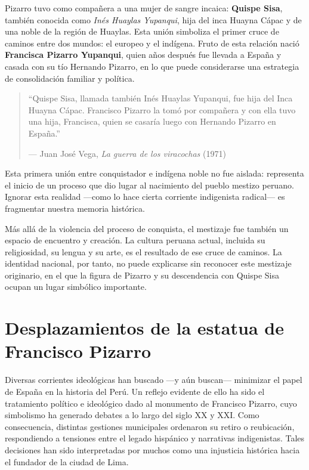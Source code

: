 \documentclass[a4paper,12pt]{article}
\begin{document}
	Pizarro tuvo como compañera a una mujer de sangre incaica: \textbf{Quispe Sisa}, también conocida como \textit{Inés Huaylas Yupanqui}, hija del inca Huayna Cápac y de una noble de la región de Huaylas. Esta unión simboliza el primer cruce de caminos entre dos mundos: el europeo y el indígena. Fruto de esta relación nació \textbf{Francisca Pizarro Yupanqui}, quien años después fue llevada a España y casada con su tío Hernando Pizarro, en lo que puede considerarse una estrategia de consolidación familiar y política.
	
	\begin{quote}
		“Quispe Sisa, llamada también Inés Huaylas Yupanqui, fue hija del Inca Huayna Cápac. Francisco Pizarro la tomó por compañera y con ella tuvo una hija, Francisca, quien se casaría luego con Hernando Pizarro en España.”
		\begin{flushright}
			— Juan José Vega, \textit{La guerra de los viracochas} (1971)
		\end{flushright}
	\end{quote}
	
	Esta primera unión entre conquistador e indígena noble no fue aislada: representa el inicio de un proceso que dio lugar al nacimiento del pueblo mestizo peruano. Ignorar esta realidad —como lo hace cierta corriente indigenista radical— es fragmentar nuestra memoria histórica.
	
	Más allá de la violencia del proceso de conquista, el mestizaje fue también un espacio de encuentro y creación. La cultura peruana actual, incluida su religiosidad, su lengua y su arte, es el resultado de ese cruce de caminos. La identidad nacional, por tanto, no puede explicarse sin reconocer este mestizaje originario, en el que la figura de Pizarro y su descendencia con Quispe Sisa ocupan un lugar simbólico importante.
	

	
	\section{Desplazamientos de la estatua de Francisco Pizarro}
	
	Diversas corrientes ideológicas han buscado —y aún buscan— minimizar el papel de España en la historia del Perú. Un reflejo evidente de ello ha sido el tratamiento político e ideológico dado al monumento de Francisco Pizarro, cuyo simbolismo ha generado debates a lo largo del siglo XX y XXI. Como consecuencia, distintas gestiones municipales ordenaron su retiro o reubicación, respondiendo a tensiones entre el legado hispánico y narrativas indigenistas. Tales decisiones han sido interpretadas por muchos como una injusticia histórica hacia el fundador de la ciudad de Lima.
	
\end{document}
